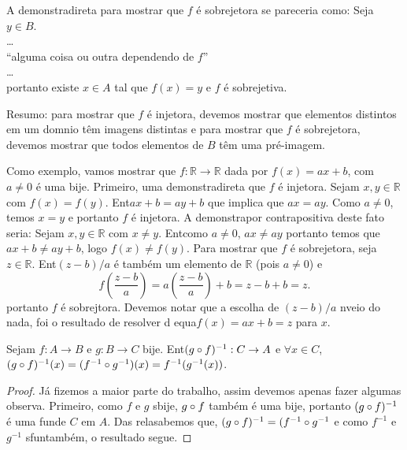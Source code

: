 A demonstra\cao direta para mostrar que $f$ \'e sobrejetora se pareceria como: Seja $y\in B$.
\\
\ldots
\\ 
``alguma coisa ou outra dependendo de $f$''
\\
\ldots
\\
portanto existe $x\in A$ tal que $f(x)=y$ e $f$ \'e sobrejetiva.

Resumo: para mostrar que $f$ \'e injetora, devemos mostrar que elementos distintos em um dom\ih nio t\^em imagens distintas e para mostrar que $f$ \'e sobrejetora, devemos mostrar que todos elementos de $B$ t\^em uma pr\'e-imagem.

Como exemplo, vamos mostrar que $f:\mathbb{R}\to\mathbb{R}$ dada por $f(x)=ax+b$, com $a\neq 0$ \'e uma bije\caoi. Primeiro, uma demonstra\cao direta que $f$ \'e injetora. Sejam $x,y\in\mathbb{R}$ com $f(x)=f(y)$. Ent\ao $ax+b=ay+b$ que implica que $ax=ay$. Como $a\neq 0$, temos $x=y$ e portanto $f$ \'e injetora. A demonstra\cao por contrapositiva deste fato seria: Sejam $x,y\in\mathbb{R}$ com $x\neq y$. Ent\ao como $a\neq 0$, $ax\neq ay$ portanto temos que $ax+b\neq ay+b$, logo $f(x)\neq f(y)$. Para mostrar que $f$ \'e sobrejetora, seja $z\in\mathbb{R}$. Ent\ao $(z-b)/a$ \'e tamb\'em um elemento de $\mathbb{R}$ (pois $a\neq 0$) e
\[
f\left(\frac{z-b}{a}\right)= a\left(\frac{z-b}{a}\right)+b=z-b+b=z.
\] 
portanto $f$ \'e sobrejtora. Devemos notar que a escolha de $(z-b)/a$ n\ao veio do nada, foi o resultado de resolver d equa\cao $f(x)=ax+b=z$ para $x$.
\begin{teob}\label{functeo16}
Sejam $f:A\to B$ e $g:B\to C$ bije\cois. Ent\ao $(g\circ f)^{-1}:C\to A$ e $\forall x\in C$, $(g\circ f)^{-1}(x)=(f^{-1}\circ g^{-1})(x)=f^{-1}(g^{-1}(x))$. 
\end{teob}
\begin{proof}
J\'a fizemos a maior parte do trabalho, assim devemos apenas fazer algumas observa\cois. Primeiro, como $f$ e $g$ s\ao bije\cois, $g\circ f$ tamb\'em \'e uma bije\caoi, portanto $(g\circ f)^{-1}$ \'e uma fun\cao de $C$ em $A$. Das rela\coes sabemos que, $(g\circ f)^{-1}=(f^{-1}\circ g^{-1}$ e como $f^{-1}$ e $g^{-1}$ s\ao fun\coes tamb\'em, o resultado segue.
\end{proof}
\\


